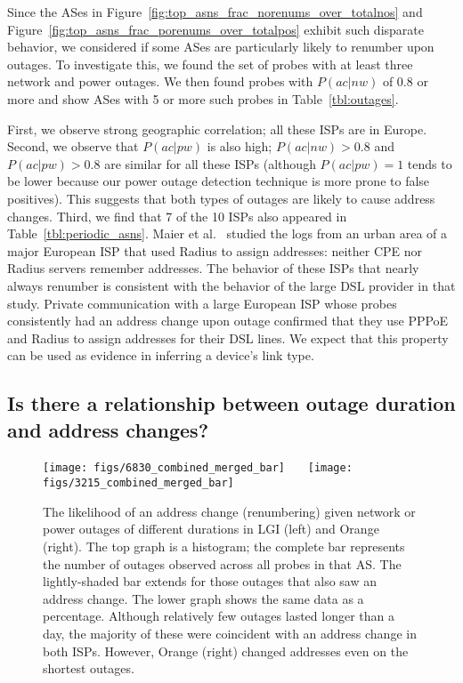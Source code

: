 Since the ASes in
Figure~\ref{fig:top_asns_frac_norenums_over_totalnos} and
Figure~\ref{fig:top_asns_frac_porenums_over_totalpos} exhibit such
disparate behavior, we considered if some ASes are particularly likely
to renumber upon outages. To investigate this, we found the set of
probes with at least three network and power outages. We then found
probes with $P(ac|nw)$ of 0.8 or more and show ASes with 5 or more
such probes in Table~\ref{tbl:outages}.

First, we observe strong geographic correlation; all these ISPs are in
Europe. Second, we observe that $P(ac|pw)$ is also high; $P(ac|nw) >
0.8$ and $P(ac|pw) > 0.8$ are similar for all these ISPs (although
$P(ac|pw) = 1$ tends to be lower because our power outage detection
technique is more prone to false positives). This suggests that both
types of outages are likely to cause address changes. Third, we find
that 7 of the 10 ISPs also appeared in Table~\ref{tbl:periodic_asns}.
Maier et al.~\cite{maier2009dominant} studied the logs from an urban
area of a major European ISP that used Radius to assign addresses:
neither CPE nor Radius servers remember addresses.  The behavior of
these ISPs that nearly always renumber is consistent with the behavior
of the large DSL provider in that study. Private communication with a
large European ISP whose probes consistently had an address change
upon outage confirmed that they use PPPoE and Radius to assign
addresses for their DSL lines. We expect that this property can be
used as evidence in inferring a device's link type.

\clearpage

\subsection{Is there a relationship between outage duration and
  address changes?}
\label{sec:outage_durs}
\begin{figure}[t]
  \texttt{[image: figs/6830\_combined\_merged\_bar]}~~~
  \texttt{[image: figs/3215\_combined\_merged\_bar]}

  \caption[Relationship between outage duration and
  address changes]{\label{fig:outagedurs} The likelihood of an address change (renumbering)
    given network or power outages of different durations in LGI (left)
    and Orange (right).  The top graph is a histogram; the
    complete bar represents the number of outages observed
    across all probes in that AS.  The lightly-shaded bar
    extends for those outages that also saw an address
    change.  The lower graph shows the same data as a
    percentage.  Although relatively few outages
    lasted longer than a day, the majority of these were
    coincident with an address change in both ISPs. However,
    Orange (right) changed addresses even on the shortest
    outages.}
\end{figure}

